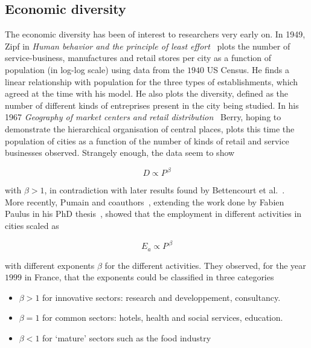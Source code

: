 \subsection{Economic diversity}
\label{sub:economic_diversity}

The economic diversity has been of interest to researchers very early on. In
1949, Zipf in \emph{Human behavior and the principle of least
effort}~\cite{Zipf:1949} plots the number of service-business, manufactures and
retail stores per city as a function of population (in log-log scale) using data
from the $1940$ US Census. He finds a linear relationship with population for
the three types of establishments, which agreed at the time with his model. He
also plots the diversity, defined as the number of different kinds of
entreprises present in the city being studied. In his 1967 \emph{Geography of
market centers and retail distribution}~\cite{Berry:1967} Berry, hoping to
demonstrate the hierarchical organisation of central places, plots this time
the population of cities as a function of the number of kinds of retail and
service businesses observed. Strangely enough, the data seem to show

\begin{equation}
    D \propto P^{\, \beta}
\end{equation}

with $\beta > 1$, in contradiction with later results found by Bettencourt et
al.~\cite{Bettencourt:2014}.\\

More recently, Pumain and coauthors~\cite{Pumain:2006}, extending the work done
by Fabien Paulus in his PhD thesis~\cite{Paulus:2004}, showed that the
employment in different activities in cities scaled as

\begin{equation}
    E_a \propto P^{\,\beta}
\end{equation}

with different exponents $\beta$ for the different activities. They observed,
for the year $1999$ in France, that the exponents could be classified in three
categories

\begin{itemize}
    \item $\beta > 1$ for innovative sectors: research and developpement,
        consultancy.
    \item $\beta = 1$ for common sectors: hotels, health and social services,
        education.
    \item $\beta < 1$ for `mature' sectors such as the food industry
\end{itemize}

